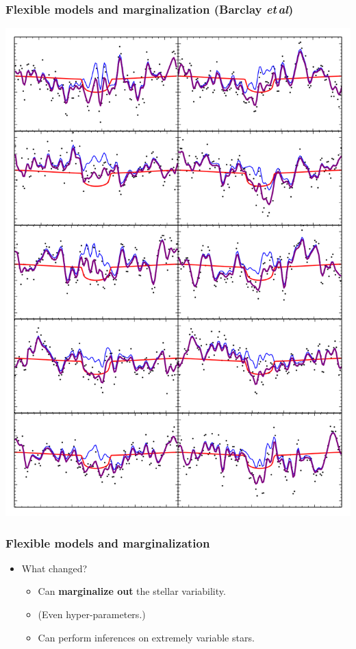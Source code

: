 \documentclass{beamer}
\newcommand{\foreign}[1]{\textsl{#1}}
\newcommand{\etal}{\foreign{et\,al}}
\renewcommand{\emph}[1]{\textbf{#1}}
\begin{document}
\begin{frame}
  \frametitle{Flexible models and marginalization \small{(Barclay \etal)}}
  \includegraphics[height=0.85\textheight]{ten_transits.png}
\end{frame}

\begin{frame}
  \frametitle{Flexible models and marginalization}
  \begin{itemize}
  \item What changed?
    \begin{itemize}
    \item Can \emph{marginalize out} the stellar variability.
    \item (Even hyper-parameters.)
    \item Can perform inferences on extremely variable stars.
    \end{itemize}
  \end{itemize}
\end{frame}
\end{document}
